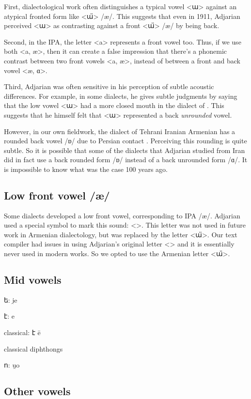 First, dialectological work often distinguishes a typical vowel <ա>  against an atypical fronted form like <ա̈> /æ/. This suggests that even in 1911, Adjarian perceived <ա> as contrasting against a front <ա̈> /æ/ by being back. 

Second, in the IPA, the letter <a> represents a front vowel too. Thus, if we use both <a, æ>, then it can create a false impression that there's a phonemic contrast between two front vowels <a, æ>, instead of between a front and back vowel <æ, ɑ>. 

Third, Adjarian was often sensitive in his perception of subtle acoustic differences. For example, in some dialects, he gives subtle judgments by saying that the low vowel <ա> had a more closed mouth in the dialect of . This suggests that he himself felt that <ա> represented a back \textit{unrounded} vowel. 

However,  in our own fieldwork, the dialect of Tehrani Iranian Armenian has a rounded back vowel /ɒ/ due to Persian contact \citep{DolatianEtAl-prep-IranianGrammar}. Perceiving this rounding is quite subtle. So it is possible that some of the dialects that Adjarian studied from Iran did in fact use a back rounded form /ɒ/ instead of a back unrounded form /ɑ/. It is impossible to know what was the case 100 years ago.

\subsection{Low front vowel /æ/}

Some dialects developed a low front vowel, corresponding to IPA /æ/. Adjarian used a special symbol to mark this sound: 
<>. This letter was not used in future work in Armenian dialectology, but was replaced by the letter <ա̈>. Our text compiler had issues in using Adjarian's original letter <> and it is essentially never used in modern works. So we opted to use the Armenian letter <ա̈>. 

\subsection{Mid vowels}


ե: i̯e

է: e

classical: է ē

classical diphthongs

ո: u̯o

\subsection{Other vowels}

